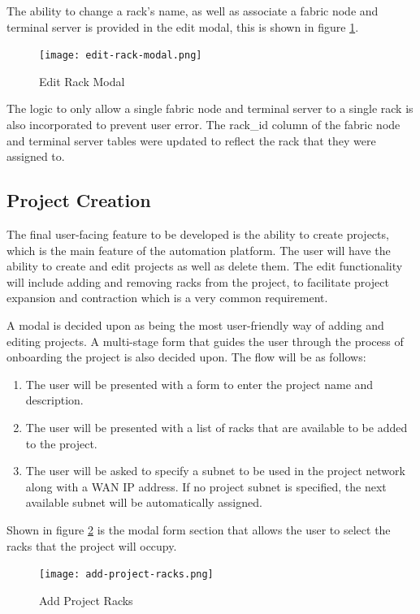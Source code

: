 The ability to change a rack's name, as well as associate a fabric node and terminal server is provided in the edit modal, this is shown in figure \ref{fig:edit-rack-modal}.

\begin{figure}[H]
    \centering
    \texttt{[image: edit-rack-modal.png]}
    \caption{Edit Rack Modal}
    \label{fig:edit-rack-modal}
\end{figure}

The logic to only allow a single fabric node and terminal server to a single rack is also incorporated to prevent user error. The rack\_id column of the fabric node and terminal server tables were updated to reflect the rack that they were assigned to.

\subsection{Project Creation}
The final user-facing feature to be developed is the ability to create projects, which is the main feature of the automation platform. The user will have the ability to create and edit projects as well as delete them. The edit functionality will include adding and removing racks from the project, to facilitate project expansion and contraction which is a very common requirement.

A modal is decided upon as being the most user-friendly way of adding and editing projects. A multi-stage form that guides the user through the process of onboarding the project is also decided upon. The flow will be as follows:
\begin{enumerate}
    \item The user will be presented with a form to enter the project name and description.
    \item The user will be presented with a list of racks that are available to be added to the project.
    \item The user will be asked to specify a subnet to be used in the project network along with a WAN IP address. If no project subnet is specified, the next available subnet will be automatically assigned.
\end{enumerate}
Shown in figure \ref{fig:add-project-racks} is the modal form section that allows the user to select the racks that the project will occupy.

\begin{figure}[H]
    \centering
    \texttt{[image: add-project-racks.png]}
    \caption{Add Project Racks}
    \label{fig:add-project-racks}
\end{figure}

